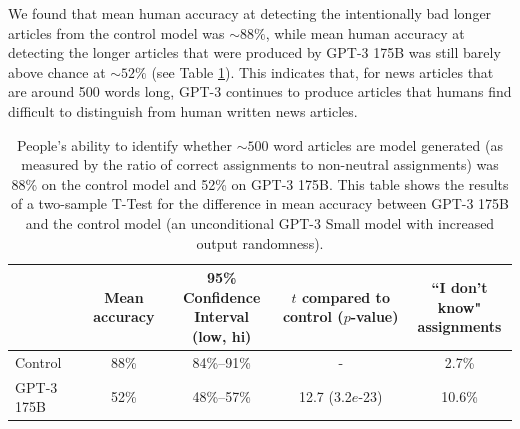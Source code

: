 \documentclass{article}
\begin{document}
 We found that mean human accuracy at detecting the intentionally bad longer articles from the control model was $\sim88\%$, while mean human accuracy at detecting the longer articles that were produced by GPT-3 175B was still barely above chance at $\sim52\%$ (see Table \ref{table:generation_long}). This indicates that, for news articles that are around 500 words long, GPT-3 continues to produce articles that humans find difficult to distinguish from human written news articles.
 
\begin{table}
    \centering
        \begin{tabular}{l c c c c}
        \toprule
         & Mean accuracy & \shortstack{95\% Confidence \\Interval (low, hi)} & \shortstack{$t$ compared to \\ control ($p$-value)} & \shortstack{``I don't know" \\ assignments} \\ 
        \midrule
Control & 88\% & 84\%–91\% & - & 2.7\% \\ 
GPT-3 175B   & 52\% & 48\%–57\% & 12.7 (3.2$e$-23) & 10.6\% \\ 
        \bottomrule
        \end{tabular}
    \caption{People’s ability to identify whether $\sim500$ word articles are model generated (as measured by the ratio of correct assignments to non-neutral assignments) was 88\% on the control model and 52\% on GPT-3 175B. This table shows the results of a two-sample T-Test for the difference in mean accuracy between GPT-3 175B and the control model (an unconditional GPT-3 Small model with increased output randomness).}
    \label{table:generation_long}
\end{table}
\end{document}
